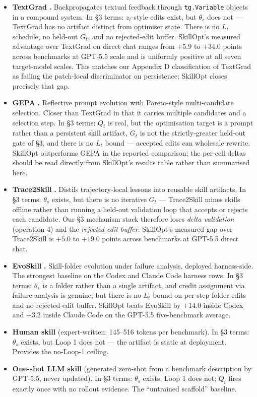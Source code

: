 \begin{itemize}
\item
  \textbf{TextGrad} \citep{yuksekgonul2024textgrad}\textbf{.}
  Backpropagates textual feedback through \texttt{tg.Variable} objects
  in a compound system. In §3 terms: \(z_t\)-style edits exist, but
  \(\theta_s\) does not --- TextGrad has no artifact distinct from
  optimiser state. There is no \(L_t\) schedule, no held-out \(G_t\),
  and no rejected-edit buffer. SkillOpt's measured advantage over
  TextGrad on direct chat ranges from \(+5.9\) to \(+34.0\) points
  across benchmarks at GPT-5.5 scale and is uniformly positive at all
  seven target-model scales. This matches our Appendix D classification
  of TextGrad as failing the patch-local discriminator on persistence;
  SkillOpt closes precisely that gap.
\item
  \textbf{GEPA} \citep{agrawal2025gepa}\textbf{.} Reflective prompt
  evolution with Pareto-style multi-candidate selection. Closer than
  TextGrad in that it carries multiple candidates and a selection step.
  In §3 terms: \(Q_t\) is real, but the optimisation target is a prompt
  rather than a persistent skill artifact, \(G_t\) is not the
  strictly-greater held-out gate of §3, and there is no \(L_t\) bound
  --- accepted edits can wholesale rewrite. SkillOpt outperforms GEPA in
  the reported comparison; the per-cell deltas should be read directly
  from SkillOpt's results table rather than summarised here.
\item
  \textbf{Trace2Skill} \citep{ni2026trace2skill}\textbf{.} Distils
  trajectory-local lessons into reusable skill artifacts. In §3 terms:
  \(\theta_s\) exists, but there is no iterative \(G_t\) --- Trace2Skill
  mines skills offline rather than running a held-out validation loop
  that accepts or rejects each candidate. Our §3 mechanism stack
  therefore loses \emph{delta validation} (operation 4) and the
  \emph{rejected-edit buffer}. SkillOpt's measured gap over Trace2Skill
  is \(+5.0\) to \(+19.0\) points across benchmarks at GPT-5.5 direct
  chat.
\item
  \textbf{EvoSkill} \citep{alzubi2026evoskill}\textbf{.} Skill-folder
  evolution under failure analysis, deployed harness-side. The strongest
  baseline on the Codex and Claude Code harness rows. In §3 terms:
  \(\theta_s\) is a folder rather than a single artifact, and credit
  assignment via failure analysis is genuine, but there is no \(L_t\)
  bound on per-step folder edits and no rejected-edit buffer. SkillOpt
  beats EvoSkill by \(+14.0\) inside Codex and \(+3.2\) inside Claude
  Code on the GPT-5.5 five-benchmark average.
\item
  \textbf{Human skill} (expert-written, 145--516 tokens per benchmark).
  In §3 terms: \(\theta_s\) exists, but Loop 1 does not --- the artifact
  is static at deployment. Provides the no-Loop-1 ceiling.
\item
  \textbf{One-shot LLM skill} (generated zero-shot from a benchmark
  description by GPT-5.5, never updated). In §3 terms: \(\theta_s\)
  exists; Loop 1 does not; \(Q_t\) fires exactly once with no rollout
  evidence. The ``untrained scaffold'' baseline.
\end{itemize}

